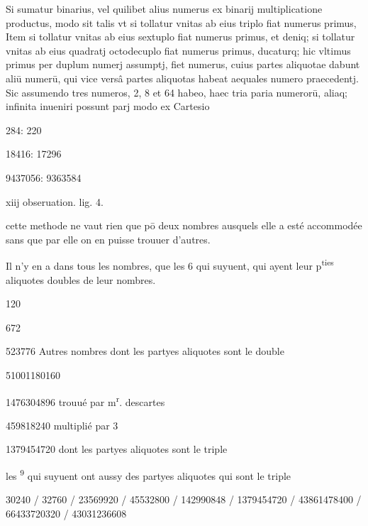 \documentclass[11pt,a4paper]{article}
\begin{document}
Si sumatur binarius, vel quilibet alius numerus ex binarij multiplicatione productus, modo sit talis vt si tollatur vnitas ab eius triplo fiat numerus primus, Item si tollatur vnitas ab eius sextuplo fiat numerus primus, et deniq; si tollatur vnitas ab eius quadratj octodecuplo fiat numerus primus, ducaturq; hic  vltimus primus per duplum numerj assumptj, fiet numerus, cuius partes aliquotae dabunt aliū numerū, qui vice versâ partes  aliquotas habeat aequales numero praecedentj. Sic assumendo tres numeros, 2, 8 et 64 habeo, haec tria paria numerorū, aliaq; infinita inueniri possunt parj modo ex Cartesio

284: 220

18416: 17296

9437056: 9363584

xiij obseruation. lig. 4.

cette methode ne vaut rien que pō  deux nombres ausquels elle a esté accommodée sans que par elle on en puisse trouuer d'autres.

Il n'y en a dans tous les nombres, que les 6 qui suyuent, qui ayent leur p\textsuperscript{ties} aliquotes doubles de leur nombres.

120

672

523776 \quad Autres nombres dont les partyes aliquotes sont le double

51001180160

1476304896 \quad trouué par m\textsuperscript{r}. descartes

459818240 \quad multiplié par 3

1379454720 \quad dont les partyes aliquotes sont le triple

les \textsuperscript{9} qui suyuent ont aussy des partyes aliquotes qui sont le triple

30240 / 32760 / 23569920 / 45532800 / 142990848 / 1379454720 / 43861478400 / 66433720320 / 43031236608
\end{document}
